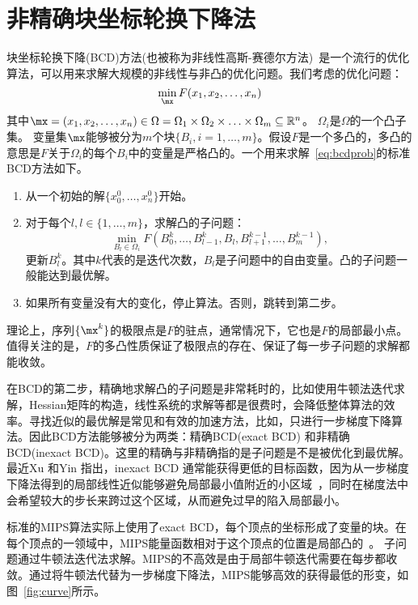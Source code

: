 \section{非精确块坐标轮换下降法} \label{sec:IBCD}
块坐标轮换下降(BCD)方法(也被称为非线性高斯-赛德尔方法)~\cite{Bonettini2011,Xu2013}是一个流行的优化算法，可以用来求解大规模的非线性与非凸的优化问题。我们考虑的优化问题：
\begin{equation}\label{eq:bcdprob}
\min_{\mx} F(x_1,x_2,\ldots,x_n)
\end{equation}
其中$\mx = (x_1,x_2,\ldots,x_n) \in \Omega = \Omega_1 \times \Omega_2 \times \ldots \times \Omega_m \subseteq \mathbb{R}^n$。 $\Omega_i$是$\Omega$的一个凸子集。 变量集$\mx$能够被分为$m$个块$\{B_i,i=1,\ldots,m\}$。假设$F$是一个多凸的，多凸的意思是$F$关于$\Omega_i$的每个$B_i$中的变量是严格凸的。一个用来求解~\ref{eq:bcdprob}的标准BCD方法如下。
\begin{enumerate}
\item 从一个初始的解$\{x_0^0, \ldots, x_n^0\}$开始。
\item 对于每个$l, l \in \{1,\ldots,m\}$，求解凸的子问题：
    $$\min_{B_l \in \Omega_i}  F(B_0^{k}, \ldots, B_{l-1}^{k}, B_{l}, B_{l+1}^{k-1},\ldots,B_{m}^{k-1}),$$
    更新$B_l^k$。其中$k$代表的是迭代次数，$B_l$是子问题中的自由变量。凸的子问题一般能达到最优解。
\item 如果所有变量没有大的变化，停止算法。否则，跳转到第二步。
\end{enumerate}
理论上，序列$\{\mx^{k}\}$的极限点是$F$的驻点，通常情况下，它也是$F$的局部最小点。值得关注的是，$F$的多凸性质保证了极限点的存在、保证了每一步子问题的求解都能收敛。

在BCD的第二步，精确地求解凸的子问题是非常耗时的，比如使用牛顿法迭代求解，Hessian矩阵的构造，线性系统的求解等都是很费时，会降低整体算法的效率。寻找近似的最优解是常见和有效的加速方法，比如，只进行一步梯度下降算法。因此BCD方法能够被分为两类：精确BCD(exact BCD) 和非精确 BCD(inexact BCD)。这里的精确与非精确指的是子问题是不是被优化到最优解。 最近Xu 和Yin 指出，inexact BCD 通常能获得更低的目标函数，因为从一步梯度下降法得到的局部线性近似能够避免局部最小值附近的小区域~\cite{Xu2013}，同时在梯度法中会希望较大的步长来跨过这个区域，从而避免过早的陷入局部最小。

标准的MIPS算法实际上使用了exact BCD，每个顶点的坐标形成了变量的块。在每个顶点的一领域中，MIPS能量函数相对于这个顶点的位置是局部凸的~\cite{Hormann2001}。 子问题通过牛顿法迭代法求解。MIPS的不高效是由于局部牛顿迭代需要在每步都收敛。通过将牛顿法代替为一步梯度下降法，MIPS能够高效的获得最低的形变，如图~\ref{fig:curve}所示。

